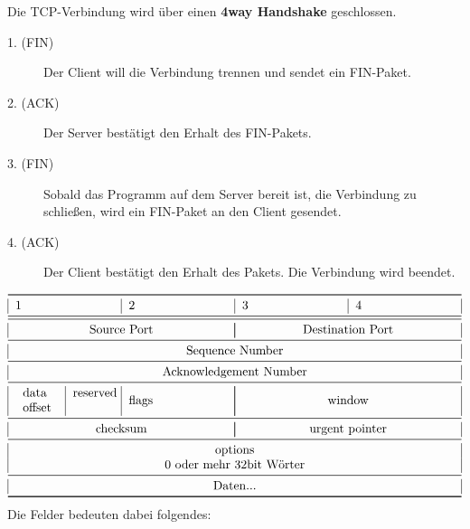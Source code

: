 \documentclass[a4paper,10pt]{scrartcl}
\begin{document}
        Die TCP-Verbindung wird über einen \textbf{4way Handshake} geschlossen.
        \begin{description}
        \item[1. (FIN)] Der Client will die Verbindung trennen und sendet ein FIN-Paket.
        \item[2. (ACK)] Der Server bestätigt den Erhalt des FIN-Pakets.
        \item[3. (FIN)] Sobald das Programm auf dem Server bereit ist, die Verbindung zu schließen, wird ein FIN-Paket an den Client gesendet.
        \item[4. (ACK)] Der Client bestätigt den Erhalt des Pakets. Die Verbindung wird beendet.
        \end{description}
        \[
        \begin{tabular}{|p{2.8cm}|p{2.8cm}|p{2.8cm}|p{2.8cm}|}
            \toprule 
            1 & 2 & 3 & 4  \\
            \midrule\midrule
            \multicolumn{2}{|c|}{Source Port} & \multicolumn{2}{|c|}{Destination Port}\\
            \midrule
            \multicolumn{4}{|c|}{Sequence Number}\\
            \midrule
            \multicolumn{4}{|c|}{Acknowledgement Number}\\
            \midrule
            \begin{tabular}{p{10mm}|p{1cm}}
             data offset &  reserved \\
            \end{tabular} & flags &  \multicolumn{2}{|c|}{window}\\
            \midrule
            \multicolumn{2}{|c|}{checksum} & \multicolumn{2}{|c|}{urgent pointer}\\
            \midrule
            \multicolumn{4}{|c|}{options}\\
            \multicolumn{4}{|c|}{0 oder mehr 32bit Wörter}\\
            \midrule
            \multicolumn{4}{|c|}{Daten...}\\
            \bottomrule
        \end{tabular}
        \]
    Die Felder bedeuten dabei folgendes:
\end{document}
